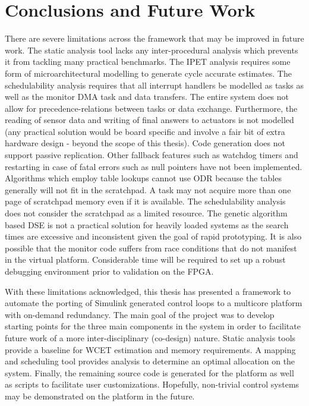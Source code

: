 
\chapter{Conclusions and Future Work} 

\label{c:concl} 

	There are severe limitations across the framework that may be improved in future work.
	The static analysis tool lacks any inter-procedural analysis which prevents it from tackling many practical benchmarks.
	The IPET analysis requires some form of microarchitectural modelling to generate cycle accurate estimates.
	The schedulability analysis requires that all interrupt handlers be modelled as tasks as well as the monitor DMA task and data transfers.
	The entire system does not allow for precedence-relations between tasks or data exchange. 
	Furthermore, the reading of sensor data and writing of final answers to actuators is not modelled (any practical solution would be board specific and involve a fair bit of extra hardware design - beyond the scope of this thesis).
	Code generation does not support passive replication.
	Other fallback features such as watchdog timers and restarting in case of fatal errors such as null pointers have not been implemented.
	Algorithms which employ table lookups cannot use ODR because the tables generally will not fit in the scratchpad.
	A task may not acquire more than one page of scratchpad memory even if it is available.
	The schedulability analysis does not consider the scratchpad as a limited resource.
	The genetic algorithm based DSE is not a practical solution for heavily loaded systems as the search times are excessive and inconsistent given the goal of rapid prototyping. 
	It is also possible that the monitor code suffers from race conditions that do not manifest in the virtual platform. 
	Considerable time will be required to set up a robust debugging environment prior to validation on the FPGA.
	

	With these limitations acknowledged, this thesis has presented a framework to automate the porting of Simulink generated control loops to a multicore platform with on-demand redundancy.
	The main goal of the project was to develop starting points for the three main components in the system in order to facilitate future work of a more inter-disciplinary (co-design) nature. 
	Static analysis tools provide a baseline for WCET estimation and memory requirements. 
	A mapping and scheduling tool provides analysis to determine an optimal allocation on the system.
	Finally, the remaining source code is generated for the platform as well as scripts to facilitate user customizations.
	Hopefully, non-trivial control systems may be demonstrated on the platform in the future.
		